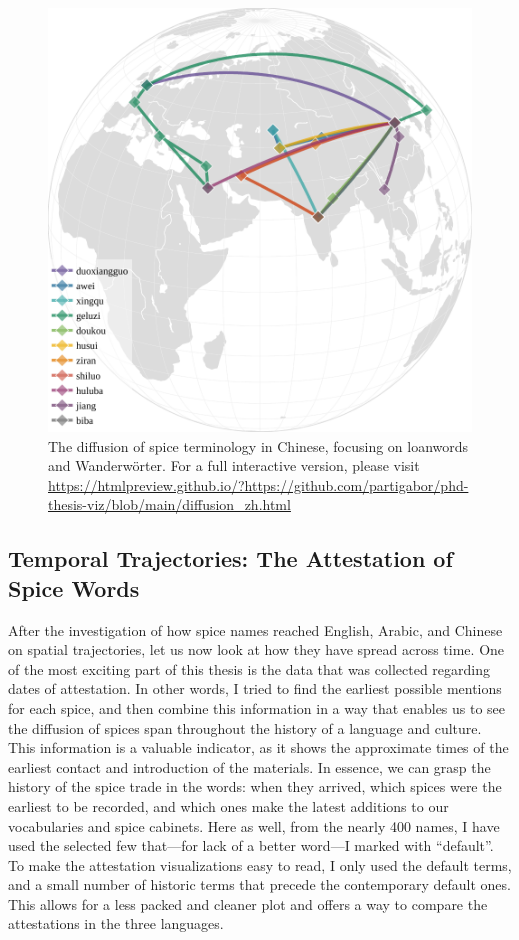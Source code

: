 \begin{figure}[ht!]
    \includegraphics[width=\linewidth]{imgs/plots/diffusion_zh.pdf}
    \caption{The diffusion of spice terminology in Chinese, focusing on loanwords and Wanderwörter. For a full interactive version, please visit \url{https://htmlpreview.github.io/?https://github.com/partigabor/phd-thesis-viz/blob/main/diffusion_zh.html}}
    \label{fig:diffusion_zh}
\end{figure}

\subsection{Temporal Trajectories: The Attestation of Spice Words}

After the investigation of how spice names reached English, Arabic, and Chinese on spatial trajectories, let us now look at how they have spread across time. One of the most exciting part of this thesis is the data that was collected regarding dates of attestation. In other words, I tried to find the earliest possible mentions for each spice, and then combine this information in a way that enables us to see the diffusion of spices span throughout the history of a language and culture. This information is a valuable indicator, as it shows the approximate times of the earliest contact and introduction of the materials. In essence, we can grasp the history of the spice trade in the words: when they arrived, which spices were the earliest to be recorded, and which ones make the latest additions to our vocabularies and spice cabinets. Here as well, from the nearly 400 names, I have used the selected few that---for lack of a better word---I marked with ``default''. To make the attestation visualizations easy to read, I only used the default terms, and a small number of historic terms that precede the contemporary default ones. This allows for a less packed and cleaner plot and offers a way to compare the attestations in the three languages. 

